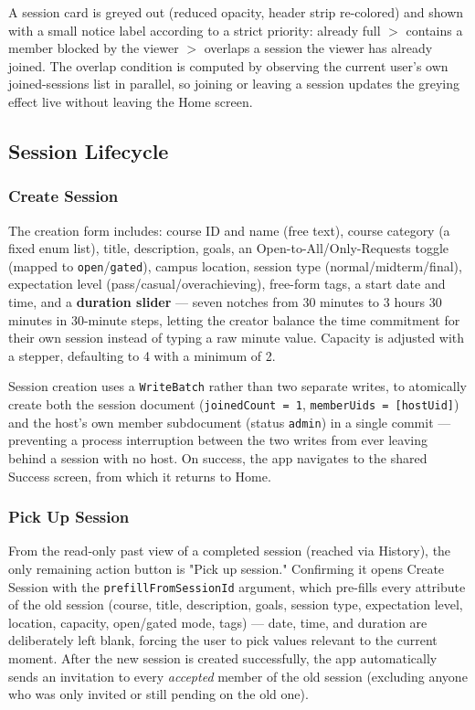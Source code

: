 A session card is greyed out (reduced opacity, header strip re-colored) and shown with a small notice label according to a strict priority: already full $>$ contains a member blocked by the viewer $>$ overlaps a session the viewer has already joined. The overlap condition is computed by observing the current user's own joined-sessions list in parallel, so joining or leaving a session updates the greying effect live without leaving the Home screen.

\subsection{Session Lifecycle}

\subsubsection{Create Session}

The creation form includes: course ID and name (free text), course category (a fixed enum list), title, description, goals, an Open-to-All/Only-Requests toggle (mapped to \texttt{open}/\texttt{gated}), campus location, session type (normal/midterm/final), expectation level (pass/casual/overachieving), free-form tags, a start date and time, and a \textbf{duration slider} — seven notches from 30 minutes to 3 hours 30 minutes in 30-minute steps, letting the creator balance the time commitment for their own session instead of typing a raw minute value. Capacity is adjusted with a stepper, defaulting to 4 with a minimum of 2.

Session creation uses a \texttt{WriteBatch} rather than two separate writes, to atomically create both the session document (\texttt{joinedCount = 1}, \texttt{memberUids = [hostUid]}) and the host's own member subdocument (status \texttt{admin}) in a single commit — preventing a process interruption between the two writes from ever leaving behind a session with no host. On success, the app navigates to the shared Success screen, from which it returns to Home.

\subsubsection{Pick Up Session}

From the read-only past view of a completed session (reached via History), the only remaining action button is "Pick up session." Confirming it opens Create Session with the \texttt{prefillFromSessionId} argument, which pre-fills every attribute of the old session (course, title, description, goals, session type, expectation level, location, capacity, open/gated mode, tags) — date, time, and duration are deliberately left blank, forcing the user to pick values relevant to the current moment. After the new session is created successfully, the app automatically sends an invitation to every \emph{accepted} member of the old session (excluding anyone who was only invited or still pending on the old one).

